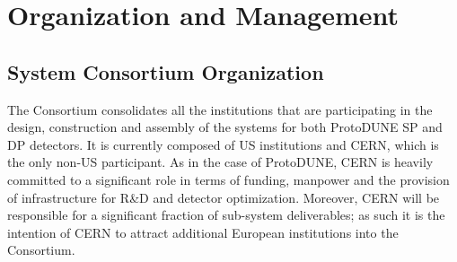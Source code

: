 


\section{Organization and Management}
\label{sec:fdsp-hv-org}


\subsection{ System Consortium Organization}
\label{sec:fdsp-hv-org-consortium}

The Consortium consolidates all the institutions that are participating in the design, construction and assembly of the  systems for both ProtoDUNE SP and DP detectors. It is currently composed of US institutions and CERN, which is the only non-US participant. As in the case of ProtoDUNE, CERN is heavily committed to a significant role in terms of funding, manpower and the provision of infrastructure for R\&D and detector optimization. Moreover, CERN will be responsible for a significant fraction of sub-system deliverables; as such it is the intention of CERN to attract additional European institutions into the Consortium.





